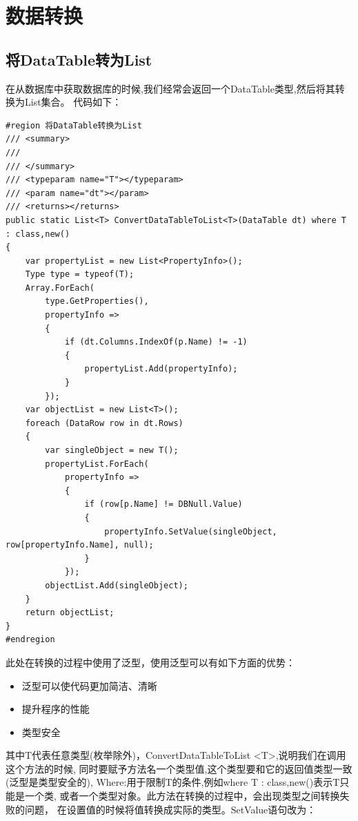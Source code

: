 \documentclass{book}
\begin{document}
\section{数据转换}

\subsection{将DataTable转为List}

在从数据库中获取数据库的时候,我们经常会返回一个DataTable类型,然后将其转换为List集合。
代码如下：

\begin{lstlisting}[language={[Sharp]C},caption=将DataTable转换为List]
#region 将DataTable转换为List
/// <summary>
/// 
/// </summary>
/// <typeparam name="T"></typeparam>
/// <param name="dt"></param>
/// <returns></returns>
public static List<T> ConvertDataTableToList<T>(DataTable dt) where T : class,new()
{
    var propertyList = new List<PropertyInfo>();
    Type type = typeof(T);
    Array.ForEach(
        type.GetProperties(),
        propertyInfo =>
        {
            if (dt.Columns.IndexOf(p.Name) != -1)
            {
                propertyList.Add(propertyInfo);
            }
        });
    var objectList = new List<T>();
    foreach (DataRow row in dt.Rows)
    {
        var singleObject = new T();
        propertyList.ForEach(
            propertyInfo =>
            {
                if (row[p.Name] != DBNull.Value)
                {
                    propertyInfo.SetValue(singleObject, row[propertyInfo.Name], null);
                }
            });
        objectList.Add(singleObject);
    }
    return objectList;
}
#endregion
\end{lstlisting}

此处在转换的过程中使用了泛型，使用泛型可以有如下方面的优势：

\begin{itemize}
\item{泛型可以使代码更加简洁、清晰}
\item{提升程序的性能}
\item{类型安全}
\end{itemize}

其中T代表任意类型(枚举除外)，ConvertDataTableToList <T>,说明我们在调用这个方法的时候,
同时要赋予方法名一个类型值,这个类型要和它的返回值类型一致(泛型是类型安全的),
Where:用于限制T的条件,例如where T : class,new()表示T只能是一个类,
或者一个类型对象。此方法在转换的过程中，会出现类型之间转换失败的问题，
在设置值的时候将值转换成实际的类型。SetValue语句改为：
\end{document}
